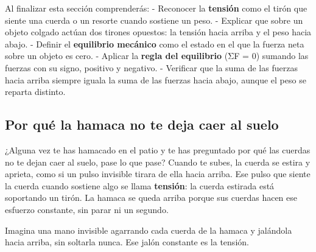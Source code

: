 \documentclass[
  spanish,
  letterpaper,
  12pt,
  oneside,
  open=any,
  DIV=15]{scrbook}
\begin{document}
\begin{tcolorbox}[enhanced jigsaw, arc=.35mm, bottomrule=.15mm, bottomtitle=1mm, breakable, colback=white, colbacktitle=quarto-callout-important-color!10!white, colframe=quarto-callout-important-color-frame, coltitle=black, left=2mm, leftrule=.75mm, opacityback=0, opacitybacktitle=0.6, rightrule=.15mm, title=\textcolor{quarto-callout-important-color}{\faExclamation}\hspace{0.5em}{Conceptos Clave (Objetivos de Aprendizaje)}, titlerule=0mm, toprule=.15mm, toptitle=1mm]

Al finalizar esta sección comprenderás: - Reconocer la \textbf{tensión}
como el tirón que siente una cuerda o un resorte cuando sostiene un
peso. - Explicar que sobre un objeto colgado actúan dos tirones
opuestos: la tensión hacia arriba y el peso hacia abajo. - Definir el
\textbf{equilibrio mecánico} como el estado en el que la fuerza neta
sobre un objeto es cero. - Aplicar la \textbf{regla del equilibrio} (ΣF
= 0) sumando las fuerzas con su signo, positivo y negativo. - Verificar
que la suma de las fuerzas hacia arriba siempre iguala la suma de las
fuerzas hacia abajo, aunque el peso se reparta distinto.

\end{tcolorbox}

\subsection{Por qué la hamaca no te deja caer al
suelo}\label{por-quuxe9-la-hamaca-no-te-deja-caer-al-suelo}

¿Alguna vez te has hamacado en el patio y te has preguntado por qué las
cuerdas no te dejan caer al suelo, pase lo que pase? Cuando te subes, la
cuerda se estira y aprieta, como si un pulso invisible tirara de ella
hacia arriba. Ese pulso que siente la cuerda cuando sostiene algo se
llama \textbf{tensión}: la cuerda estirada está soportando un tirón. La
hamaca se queda arriba porque sus cuerdas hacen ese esfuerzo constante,
sin parar ni un segundo.

\begin{tcolorbox}[enhanced jigsaw, arc=.35mm, bottomrule=.15mm, bottomtitle=1mm, breakable, colback=white, colbacktitle=quarto-callout-note-color!10!white, colframe=quarto-callout-note-color-frame, coltitle=black, left=2mm, leftrule=.75mm, opacityback=0, opacitybacktitle=0.6, rightrule=.15mm, title=\textcolor{quarto-callout-note-color}{\faInfo}\hspace{0.5em}{Apoyo Visual}, titlerule=0mm, toprule=.15mm, toptitle=1mm]

Imagina una mano invisible agarrando cada cuerda de la hamaca y
jalándola hacia arriba, sin soltarla nunca. Ese jalón constante es la
tensión.

\end{tcolorbox}
\end{document}
